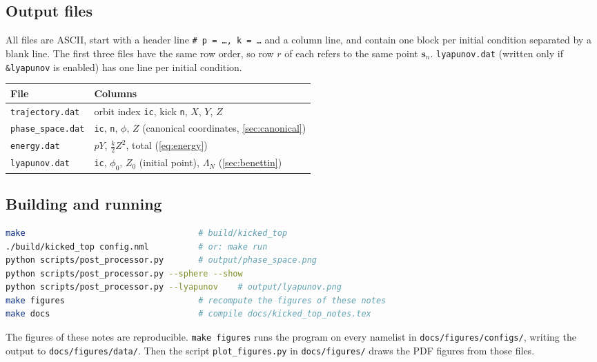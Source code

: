 \documentclass[11pt,a4paper]{article}
\newcommand{\vs}{\bm{s}}
\begin{document}
\subsection{Output files}

All files are ASCII, start with a header line \texttt{\# p = \dots, k = \dots} and a column line, and contain one
block per initial condition separated by a blank line. The first three files have the same row order, so row $r$ of
each refers to the same point $\vs_n$. \texttt{lyapunov.dat} (written only if \texttt{\&lyapunov} is enabled) has one line
per initial condition.
\begin{center}
\small
\begin{tabular}{ll}
  \toprule
  File & Columns \\
  \midrule
  \texttt{trajectory.dat} & orbit index \texttt{ic}, kick \texttt{n}, $X$, $Y$, $Z$ \\
  \texttt{phase\_space.dat} & \texttt{ic}, \texttt{n}, $\phi$, $Z$ \quad (canonical coordinates, \cref{sec:canonical}) \\
  \texttt{energy.dat} & $pY$, $\frac k2 Z^2$, total \quad (\cref{eq:energy}) \\
  \texttt{lyapunov.dat} & \texttt{ic}, $\phi_0$, $Z_0$ (initial point), $\Lambda_N$ \quad (\cref{sec:benettin}) \\
  \bottomrule
\end{tabular}
\end{center}

\subsection{Building and running}

\begin{lstlisting}[language=bash, numbers=none]
make                                   # build/kicked_top
./build/kicked_top config.nml          # or: make run
python scripts/post_processor.py       # output/phase_space.png
python scripts/post_processor.py --sphere --show
python scripts/post_processor.py --lyapunov    # output/lyapunov.png
make figures                           # recompute the figures of these notes
make docs                              # compile docs/kicked_top_notes.tex
\end{lstlisting}
The figures of these notes are reproducible. \texttt{make figures} runs the program on every namelist in
\texttt{docs/figures/configs/}, writing the output to \texttt{docs/figures/data/}. Then the script
\texttt{plot\_figures.py} in \texttt{docs/figures/} draws the PDF figures from those files.
\end{document}
